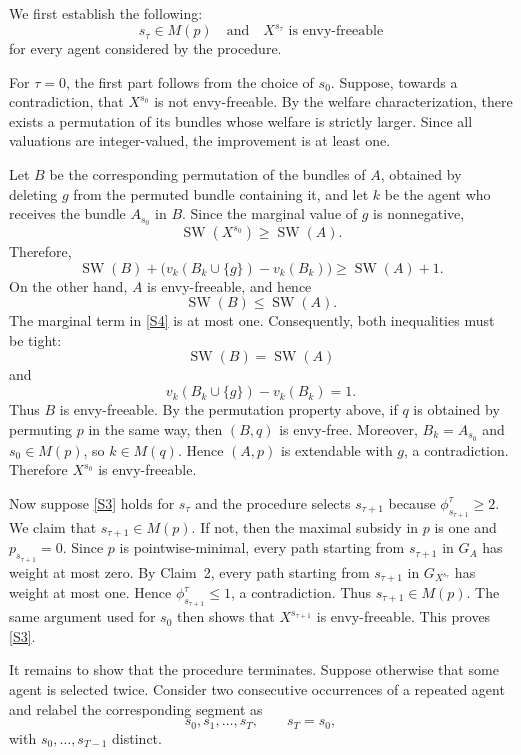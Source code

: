 \documentclass[11pt]{article}
\makeatletter
\theoremstyle{plain}
\theoremstyle{plain}
\renewenvironment{proof}[1][\proofname]{\par
  \pushQED{\qed}%
  \normalfont \topsep6\p@\@plus6\p@\relax
  \trivlist
  \item[\hskip\labelsep\bfseries #1\@addpunct{}]\ignorespaces
}{%
  \popQED\endtrivlist\@endpefalse
}
\makeatother
\begin{document}
\begin{proof}
We first establish the following:
\begin{equation}\label{S3}
    s_\tau\in M(p)
\quad\text{and}\quad
X^{s_\tau}\text{ is envy-freeable}
\end{equation}
for every agent considered by the procedure.

For $\tau=0$, the first part follows from the choice of $s_0$. Suppose, towards a contradiction, that $X^{s_0}$ is not
envy-freeable. By the welfare characterization, there exists a permutation of its bundles whose welfare is strictly larger. Since all valuations are integer-valued, the improvement is at
least one.

Let $B$ be the corresponding permutation of the bundles of $A$, obtained by deleting $g$ from the permuted bundle containing it, and let $k$ be the agent who receives the bundle $A_{s_0}$ in $B$. Since the marginal value of $g$ is nonnegative,
\[
\operatorname{SW}(X^{s_0})\geq\operatorname{SW}(A).
\]
Therefore,
\begin{equation}\label{S4}
\operatorname{SW}(B)
+
\bigl(v_k(B_k\cup\{g\})-v_k(B_k)\bigr)
\geq
\operatorname{SW}(A)+1.
\end{equation}
On the other hand, $A$ is envy-freeable, and hence
\[
\operatorname{SW}(B)\leq\operatorname{SW}(A).
\]
The marginal term in \eqref{S4} is at most one. Consequently, both inequalities must be tight:
\[
\operatorname{SW}(B)=\operatorname{SW}(A)
\]
and
\[
v_k(B_k\cup\{g\})-v_k(B_k)=1.
\]
Thus $B$ is envy-freeable. By the permutation property above, if $q$ is obtained by permuting $p$ in the same way, then $(B,q)$ is envy-free. Moreover, $B_k=A_{s_0}$ and $s_0\in M(p)$, so $k\in M(q)$. Hence $(A,p)$ is extendable with $g$, a contradiction. Therefore $X^{s_0}$ is envy-freeable.

Now suppose \eqref{S3} holds for $s_\tau$ and the procedure selects $s_{\tau+1}$ because $\phi^\tau_{s_{\tau+1}}\geq2$. We claim that $s_{\tau+1}\in M(p)$. If not, then the maximal subsidy in $p$ is one and $p_{s_{\tau+1}}=0$. Since $p$ is pointwise-minimal, every path starting from $s_{\tau+1}$ in $G_A$ has weight at most zero. By Claim~2, every path starting from $s_{\tau+1}$ in $G_{X^{s_\tau}}$ has weight at most one. Hence $\phi^\tau_{s_{\tau+1}}\leq1$, a contradiction. Thus $s_{\tau+1}\in M(p)$. The same argument used for $s_0$ then shows that $X^{s_{\tau+1}}$ is envy-freeable. This proves \eqref{S3}.

It remains to show that the procedure terminates. Suppose otherwise that some agent is selected twice. Consider two consecutive occurrences of a repeated agent and relabel the corresponding segment
as
\[
s_0,s_1,\ldots,s_T,
\qquad
s_T=s_0,
\]
with $s_0,\ldots,s_{T-1}$ distinct.


\end{proof}
\end{document}
